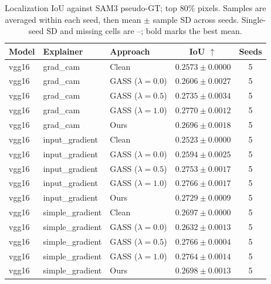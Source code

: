 \begin{table}[t]
\centering
\caption{Localization IoU against SAM3 pseudo-GT; top 80\% pixels. Samples are averaged within each seed, then mean $\pm$ sample SD across seeds. Single-seed SD and missing cells are --; bold marks the best mean.}
\begin{tabular}{lllcc}
\hline
Model & Explainer & Approach & IoU $\uparrow$ & Seeds \\
\hline
vgg16 & grad\_cam & Clean & $0.2573 \pm 0.0000$ & 5 \\
vgg16 & grad\_cam & GASS ($\lambda=0.0$) & $0.2606 \pm 0.0027$ & 5 \\
vgg16 & grad\_cam & GASS ($\lambda=0.5$) & $0.2735 \pm 0.0034$ & 5 \\
vgg16 & grad\_cam & GASS ($\lambda=1.0$) & $\mathbf{0.2770 \pm 0.0012}$ & 5 \\
vgg16 & grad\_cam & Ours & $0.2696 \pm 0.0018$ & 5 \\
\hline
vgg16 & input\_gradient & Clean & $0.2523 \pm 0.0000$ & 5 \\
vgg16 & input\_gradient & GASS ($\lambda=0.0$) & $0.2594 \pm 0.0025$ & 5 \\
vgg16 & input\_gradient & GASS ($\lambda=0.5$) & $0.2753 \pm 0.0017$ & 5 \\
vgg16 & input\_gradient & GASS ($\lambda=1.0$) & $\mathbf{0.2766 \pm 0.0017}$ & 5 \\
vgg16 & input\_gradient & Ours & $0.2729 \pm 0.0009$ & 5 \\
\hline
vgg16 & simple\_gradient & Clean & $0.2697 \pm 0.0000$ & 5 \\
vgg16 & simple\_gradient & GASS ($\lambda=0.0$) & $0.2632 \pm 0.0013$ & 5 \\
vgg16 & simple\_gradient & GASS ($\lambda=0.5$) & $\mathbf{0.2766 \pm 0.0004}$ & 5 \\
vgg16 & simple\_gradient & GASS ($\lambda=1.0$) & $0.2764 \pm 0.0014$ & 5 \\
vgg16 & simple\_gradient & Ours & $0.2698 \pm 0.0013$ & 5 \\
\hline
\end{tabular}
\end{table}
